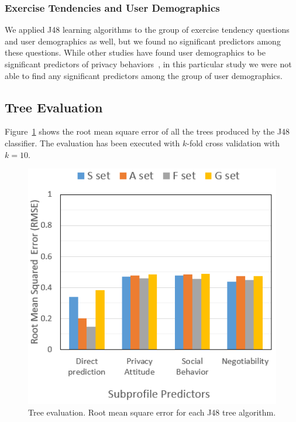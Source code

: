 \subsubsection{Exercise Tendencies and User Demographics}


We applied J48 learning algorithms to the group of exercise tendency questions and user demographics as well, but we found no significant predictors among these questions. While other studies have found user demographics to be significant predictors of privacy behaviors~\cite{knijnenburg2013helping}, in this particular study we were not able to find any significant predictors among the group of user demographics. 



\subsection{Tree Evaluation}

Figure~\ref{fig:treermse} shows the root mean square error of all the trees produced by the J48 classifier. The evaluation has been executed with $k$-fold cross validation with $k=10$.

\begin{figure}[ht]
	\includegraphics[width=1\linewidth]{figures/rmse4.png}
	\caption{Tree evaluation. Root mean square error for each J48 tree algorithm.}
	\label{fig:treermse}      
\end{figure}


